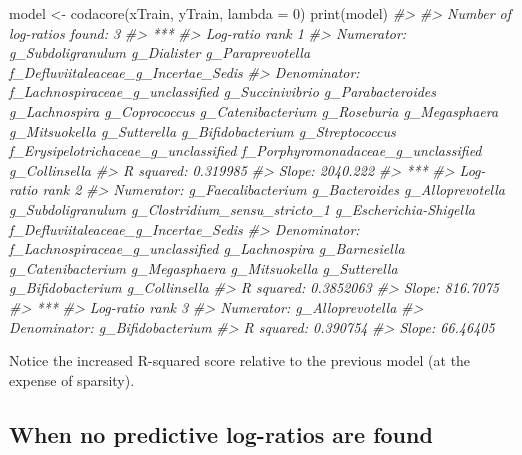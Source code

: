 \documentclass[
]{article}
\newenvironment{Shaded}{\begin{snugshade}}{\end{snugshade}}
\newcommand{\AttributeTok}[1]{\textcolor[rgb]{0.77,0.63,0.00}{#1}}
\newcommand{\CommentTok}[1]{\textcolor[rgb]{0.56,0.35,0.01}{\textit{#1}}}
\newcommand{\DecValTok}[1]{\textcolor[rgb]{0.00,0.00,0.81}{#1}}
\newcommand{\FunctionTok}[1]{\textcolor[rgb]{0.00,0.00,0.00}{#1}}
\newcommand{\NormalTok}[1]{#1}
\newcommand{\OtherTok}[1]{\textcolor[rgb]{0.56,0.35,0.01}{#1}}
\begin{document}
\begin{Shaded}
\begin{Highlighting}[]
\NormalTok{model }\OtherTok{\textless{}{-}} \FunctionTok{codacore}\NormalTok{(xTrain, yTrain, }\AttributeTok{lambda =} \DecValTok{0}\NormalTok{)}
\FunctionTok{print}\NormalTok{(model)}
\CommentTok{\#\textgreater{} }
\CommentTok{\#\textgreater{} Number of log{-}ratios found: 3}
\CommentTok{\#\textgreater{} ***}
\CommentTok{\#\textgreater{} Log{-}ratio rank 1}
\CommentTok{\#\textgreater{} Numerator: g\_Subdoligranulum g\_Dialister g\_Paraprevotella f\_Defluviitaleaceae\_g\_Incertae\_Sedis}
\CommentTok{\#\textgreater{} Denominator: f\_Lachnospiraceae\_g\_unclassified g\_Succinivibrio g\_Parabacteroides g\_Lachnospira g\_Coprococcus g\_Catenibacterium g\_Roseburia g\_Megasphaera g\_Mitsuokella g\_Sutterella g\_Bifidobacterium g\_Streptococcus f\_Erysipelotrichaceae\_g\_unclassified f\_Porphyromonadaceae\_g\_unclassified g\_Collinsella}
\CommentTok{\#\textgreater{} R squared: 0.319985}
\CommentTok{\#\textgreater{} Slope: 2040.222}
\CommentTok{\#\textgreater{} ***}
\CommentTok{\#\textgreater{} Log{-}ratio rank 2}
\CommentTok{\#\textgreater{} Numerator: g\_Faecalibacterium g\_Bacteroides g\_Alloprevotella g\_Subdoligranulum g\_Clostridium\_sensu\_stricto\_1 g\_Escherichia{-}Shigella f\_Defluviitaleaceae\_g\_Incertae\_Sedis}
\CommentTok{\#\textgreater{} Denominator: f\_Lachnospiraceae\_g\_unclassified g\_Lachnospira g\_Barnesiella g\_Catenibacterium g\_Megasphaera g\_Mitsuokella g\_Sutterella g\_Bifidobacterium g\_Collinsella}
\CommentTok{\#\textgreater{} R squared: 0.3852063}
\CommentTok{\#\textgreater{} Slope: 816.7075}
\CommentTok{\#\textgreater{} ***}
\CommentTok{\#\textgreater{} Log{-}ratio rank 3}
\CommentTok{\#\textgreater{} Numerator: g\_Alloprevotella}
\CommentTok{\#\textgreater{} Denominator: g\_Bifidobacterium}
\CommentTok{\#\textgreater{} R squared: 0.390754}
\CommentTok{\#\textgreater{} Slope: 66.46405}
\end{Highlighting}
\end{Shaded}

Notice the increased R-squared score relative to the previous model (at
the expense of sparsity).

\hypertarget{when-no-predictive-log-ratios-are-found}{%
\subsection{When no predictive log-ratios are
found}\label{when-no-predictive-log-ratios-are-found}}
\end{document}
